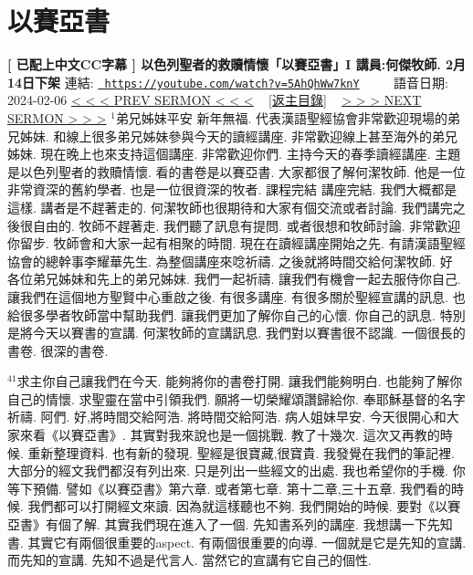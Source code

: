\documentclass{book}
\begin{document}
\section{以賽亞書}
\label{sec:5AhQhWw7knY}
\textbf{[ 已配上中文CC字幕 ] 以色列聖者的救贖情懷「以賽亞書」I 講員:何傑牧師. 2月14日下架}
\newline
\newline
連結: \href{https://youtube.com/watch?v=5AhQhWw7knY}{\texttt{ https://youtube.com/watch?v=5AhQhWw7knY}} ~~~~ 語音日期: 2024-02-06 
\newline
\newline
\hyperref[sec:FsXNMWFwxHg]{\small{< < < PREV SERMON < < <}}
~
\hyperref[sec:index]{\small{[返主目錄]}}
~
\hyperref[sec:KwXlOVraPWE]{\small{> > > NEXT SERMON > > >}}
\newline
\newline
$^{1}$弟兄姊妹平安 新年無福.
代表漢語聖經協會非常歡迎現場的弟兄姊妹.
和線上很多弟兄姊妹參與今天的讀經講座.
非常歡迎線上甚至海外的弟兄姊妹.
現在晚上也來支持這個講座.
非常歡迎你們.
主持今天的春季讀經講座.
主題是以色列聖者的救贖情懷.
看的書卷是以賽亞書.
大家都很了解何潔牧師.
他是一位非常資深的舊約學者.
也是一位很資深的牧者.
課程完結 講座完結.
我們大概都是這樣.
講者是不趕著走的.
何潔牧師也很期待和大家有個交流或者討論.
我們講完之後很自由的.
牧師不趕著走.
我們聽了訊息有提問.
或者很想和牧師討論.
非常歡迎你留步.
牧師會和大家一起有相聚的時間.
現在在讀經講座開始之先.
有請漢語聖經協會的總幹事李耀華先生.
為整個講座來唸祈禱.
之後就將時間交給何潔牧師.
好 各位弟兄姊妹和先上的弟兄姊妹.
我們一起祈禱.
讓我們有機會一起去服侍你自己.
讓我們在這個地方聖賢中心重啟之後.
有很多講座.
有很多關於聖經宣講的訊息.
也給很多學者牧師當中幫助我們.
讓我們更加了解你自己的心懷.
你自己的訊息.
特別是將今天以賽書的宣講.
何潔牧師的宣講訊息.
我們對以賽書很不認識.
一個很長的書卷.
很深的書卷.

$^{41}$求主你自己讓我們在今天.
能夠將你的書卷打開.
讓我們能夠明白.
也能夠了解你自己的情懷.
求聖靈在當中引領我們.
願將一切榮耀頌讚歸給你.
奉耶穌基督的名字祈禱.
阿們.
好,將時間交給阿浩.
將時間交給阿浩.
病人姐妹早安.
今天很開心和大家來看《以賽亞書》.
其實對我來說也是一個挑戰.
教了十幾次.
這次又再教的時候.
重新整理資料.
也有新的發現.
聖經是很寶藏,很寶貴.
我發覺在我們的筆記裡.
大部分的經文我們都沒有列出來.
只是列出一些經文的出處.
我也希望你的手機.
你等下預備.
譬如《以賽亞書》第六章.
或者第七章.
第十二章,三十五章.
我們看的時候.
我們都可以打開經文來讀.
因為就這樣聽也不夠.
我們開始的時候.
要對《以賽亞書》有個了解.
其實我們現在進入了一個.
先知書系列的講座.
我想講一下先知書.
其實它有兩個很重要的aspect.
有兩個很重要的向導.
一個就是它是先知的宣講.
而先知的宣講.
先知不過是代言人.
當然它的宣講有它自己的個性.
\end{document}
